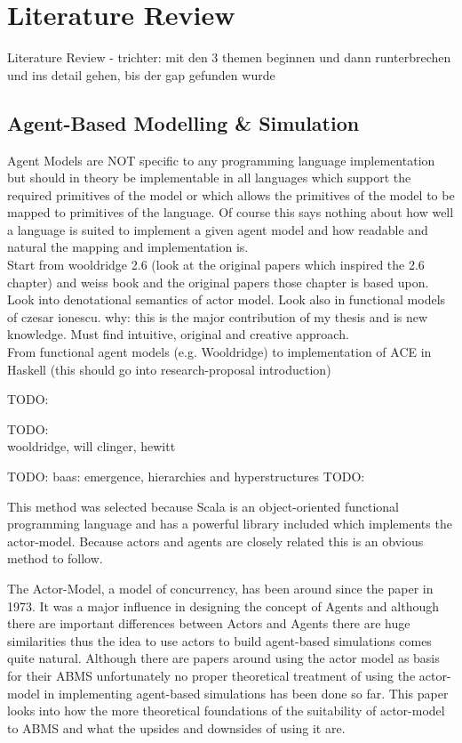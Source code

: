 \chapter{Literature Review}
Literature Review
- trichter: mit den 3 themen beginnen und dann runterbrechen und ins detail gehen, bis der gap gefunden wurde

\section{Agent-Based Modelling \& Simulation}
Agent Models are NOT specific to any programming language implementation but should in theory be implementable in all languages which support the required primitives of the model or which allows the primitives of the model to be mapped to primitives of the language. Of course this says nothing about how well a language is suited to implement a given agent model and how readable and natural the mapping and implementation is. \\

Start from wooldridge 2.6 (look at the original papers which inspired the 2.6 chapter) and weiss book and the original papers those chapter is based upon. Look into denotational semantics of actor model. Look also in functional models of czesar ionescu. why: this is the major contribution of my thesis and is new knowledge. Must find intuitive, original and creative approach. \\
From functional agent models (e.g. Wooldridge) to implementation of ACE in Haskell (this should go into research-proposal introduction)

TODO: \cite{Genesereth1987}

TODO: \cite{Muller1997}\\

 wooldridge,  will clinger, hewitt

TODO: baas: emergence, hierarchies and hyperstructures
TODO: \cite{baas_emergence_1997}

This method was selected because Scala is an object-oriented functional programming language and has a powerful library included which implements the actor-model. Because actors and agents are closely related this is an obvious method to follow.


The Actor-Model, a model of concurrency, has been around since the paper \cite{Hewitt_1973} in 1973. It was a major influence in designing the concept of Agents and although there are important differences between Actors and Agents there are huge similarities thus the idea to use actors to build agent-based simulations comes quite natural. Although there are papers around using the actor model as basis for their ABMS unfortunately no proper theoretical treatment of using the actor-model in implementing agent-based simulations has been done so far. This paper looks into how the more theoretical foundations of the suitability of actor-model to ABMS and what the upsides and downsides of using it are.

